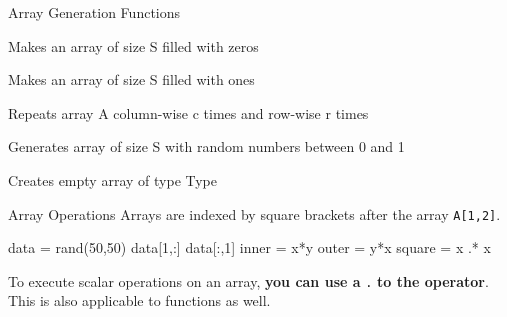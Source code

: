 \documentclass{beamer}
\newenvironment{Boxx}{\begin{tcolorbox}[standard jigsaw, opacityframe=0.8, opacityback=0.0,left=2pt,right=2pt,top=0pt,bottom=0pt]}{\end{tcolorbox}}
\begin{document}
\begin{frame}[fragile]{Array Generation Functions}
	\begin{description}[leftmargin=*]
		\item[zeros(S)] Makes an array of size S filled with zeros  
		\item[ones(S)]  Makes an array of size S filled with ones 
		\item[repeat(A,c,r)] Repeats array A column-wise c times and row-wise r times
		\item[rand(S)] Generates array of size S with random numbers between 0 and 1
		\item[Type\textbf{[]}] Creates empty array of type Type
	\end{description}
	
\end{frame}

\begin{frame}[fragile]{Array Operations}
	Arrays are indexed by square brackets after the array {\color{red}\verb|A[1,2]|}. 
	
\pause	
  \begin{Boxx}
  \begin{jllisting}
		data = rand(50,50)
		data[1,:]
		data[:,1]
		inner = x*y
		outer = y*x
		square = x .* x
	\end{jllisting}
  \end{Boxx}

	
	To execute scalar operations on an array, \textbf{you can use a} \verb|.| \textbf{to the operator}. This is also applicable to functions as well.
		
	\pause
	\vspace*{0.5cm}
	\pause
	
	\vspace*{0.5cm}
	
	
\end{frame}
\end{document}
